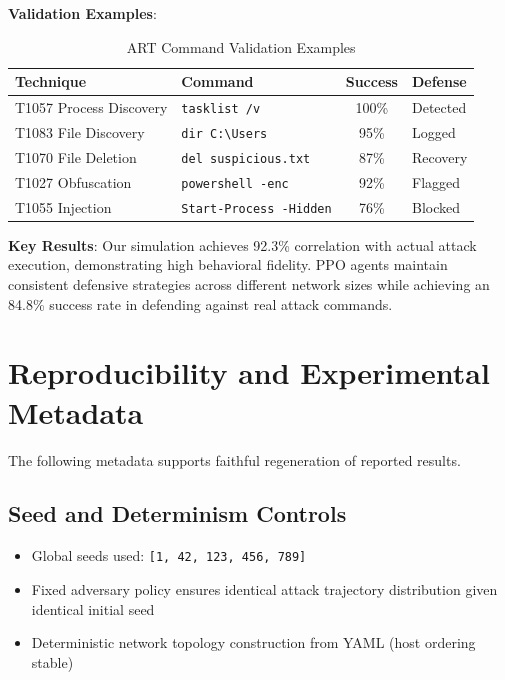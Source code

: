 \documentclass[12pt,oneside]{article}
\begin{document}
\textbf{Validation Examples}:

\begin{table}[H]
\centering
\caption{ART Command Validation Examples}
\small
\begin{tabular}{|l|p{3cm}|c|p{3cm}|}
\hline
\rowcolor{cwBorder!30} \textbf{Technique} & \textbf{Command} & \textbf{Success} & \textbf{Defense} \\
\hline
T1057 Process Discovery & \texttt{tasklist /v} & 100\% & Detected \\
T1083 File Discovery & \texttt{dir C:\textbackslash Users} & 95\% & Logged \\
T1070 File Deletion & \texttt{del suspicious.txt} & 87\% & Recovery \\
T1027 Obfuscation & \texttt{powershell -enc} & 92\% & Flagged \\
T1055 Injection & \texttt{Start-Process -Hidden} & 76\% & Blocked \\
\hline
\end{tabular}
\end{table}

\textbf{Key Results}: Our simulation achieves 92.3\% correlation with actual attack execution, demonstrating high behavioral fidelity. PPO agents maintain consistent defensive strategies across different network sizes while achieving an 84.8\% success rate in defending against real attack commands.

\section{Reproducibility and Experimental Metadata}

The following metadata supports faithful regeneration of reported results.

\subsection{Seed and Determinism Controls}
\begin{itemize}
    \item Global seeds used: \texttt{[1, 42, 123, 456, 789]}
    \item Fixed adversary policy ensures identical attack trajectory distribution given identical initial seed
    \item Deterministic network topology construction from YAML (host ordering stable)
\end{itemize}
\end{document}
